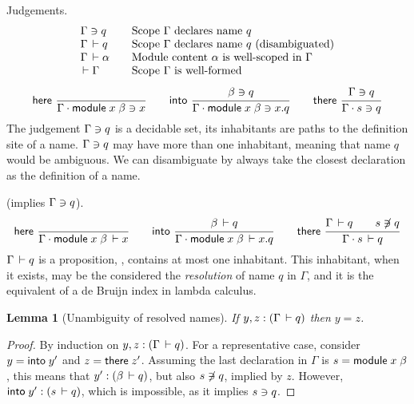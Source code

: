\documentclass{article}
\theoremstyle{definition}
\theoremstyle{plain}
\newtheorem{lemma}{Lemma}
\theoremstyle{remark}
\begin{document}
Judgements.
\[
\begin{array}{l@{\qquad}l}
  \Contains \Gamma q & \mbox{Scope $\Gamma$ declares name $q$} \\
  \Declares \Gamma q & \mbox{Scope $\Gamma$ declares name $q$ (disambiguated)} \\
  \WContent \Gamma \alpha & \mbox{Module content $\alpha$ is well-scoped in $\Gamma$}\\
  \WScope \Gamma & \mbox{Scope $\Gamma$ is well-formed}
\end{array}
\]
\begin{gather*}
  \nru{\rhere
     }{
     }{\Contains {\Gamma \sep \mdef x \beta} x}
\qquad
  \nru{\rinto
     }{\Contains \beta q
     }{\Contains {\Gamma \sep \mdef x \beta} {x.q}}
\qquad
   \nru{\rthere
      }{\Contains \Gamma q
      }{\Contains {\Gamma \sep s} q}
\end{gather*}
The judgement $\Gamma\ni q$ is a decidable set, its inhabitants
are paths to the definition site of a name.
$\Gamma\ni q$ may have more than one inhabitant, meaning that
name $q$ would be ambiguous.
We can disambiguate by always take the closest declaration as the
definition of a name.

 (implies $\Gamma\ni q$).
\begin{gather*}
  \nru{\rhere
     }{
     }{\Declares {\Gamma \sep \mdef x \beta} x}
\qquad
  \nru{\rinto
     }{\Declares \beta q
     }{\Declares {\Gamma \sep \mdef x \beta} {x.q}}
\qquad
   \nru{\rthere
      }{\Declares \Gamma q \qquad \NotContains s q
      }{\Declares {\Gamma \sep s} q}
\end{gather*}
$\Gamma\,\vdash q$ is a proposition, \ie, contains at most one
inhabitant.  This inhabitant, when it exists, may be the considered
the \emph{resolution} of name $q$ in $\Gamma$, and it is the
equivalent of a de Bruijn index in lambda calculus.
\begin{lemma}[Unambiguity of resolved names]
  If $y,z : (\Gamma\,\vdash q)$ then $y = z$.
\end{lemma}
\begin{proof}
  By induction on $y,z : (\Gamma\,\vdash q)$.
  For a representative case, consider
  $y = \mathsf{into}\;y'$ and $z = \mathsf{there}\;z'$.
  Assuming the last declaration in $\Gamma$ is $s = \mathsf{module}\;x\;\beta$,
  this means that $y' : (\beta\,\vdash q)$,
  but also $s\not\owns q$, implied by $z$.  However,
  $\mathsf{into}\;y' : (s\,\vdash q)$, which is impossible, as it implies
  $s\ni q$.
\end{proof}
\end{document}
